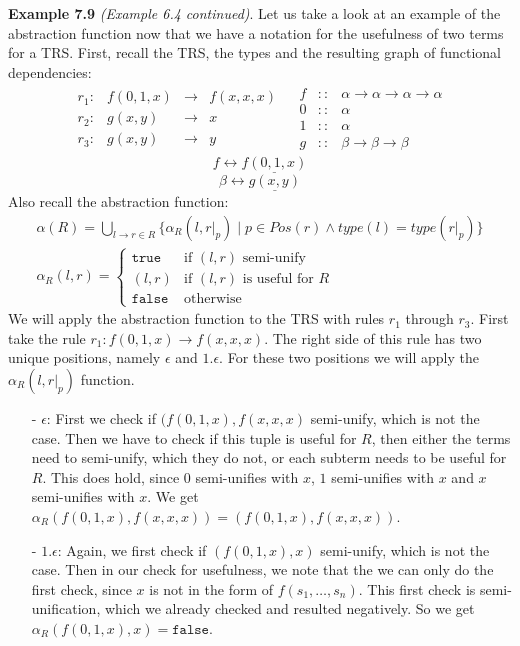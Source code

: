 \textbf{Example 7.9} \textit{(Example 6.4 continued)}. Let us take a look at an example of the abstraction function now that we have a notation for the usefulness of two terms for a TRS. First, recall the TRS, the types and the resulting graph of functional dependencies:
\[
\begin{array}{rl}
\begin{array}{lrcl}
    r_1: & f(0, 1, x) & \rightarrow & f(x, x, x) \\
    r_2: & g(x, y) & \rightarrow & x \\
    r_3: & g(x, y) & \rightarrow & y
\end{array} &
\begin{array}{rcl}
    f & :: & \alpha \rightarrow \alpha \rightarrow \alpha \rightarrow \alpha \\
    0 & :: & \alpha \\
    1 & :: & \alpha \\
    g & :: & \beta \rightarrow \beta \rightarrow \beta 
\end{array}
\end{array}
\]
\[
f \longleftrightarrow \underline{f(0, 1, x)} 
\]
\[
\beta \longleftrightarrow \underline{g(x,y)}
\]
Also recall the abstraction function:
\[
\begin{array}{c}
\alpha(R) = \bigcup\limits_{l \rightarrow r \in R} \{\alpha_R(l, \left.r\right|_p) \mid p \in \textit{Pos}(r) \land \textit{type}(l) = \textit{type}(\left.r\right|_p)\} \\
\alpha_R(l, r) =
\left\{
    \begin{array}{ll}
        \texttt{true} & \text{if } (l, r) \text{ semi-unify}\\
        (l, r) & \text{if } (l, r) \text{ is useful for } R\\
        \texttt{false} & \text{otherwise}
    \end{array}
\right.
\end{array}
\]
We will apply the abstraction function to the TRS with rules $r_1$ through $r_3$. First take the rule $r_1 : f(0, 1, x) \rightarrow f(x, x, x)$. The right side of this rule has two unique positions, namely $\epsilon$ and $1.\epsilon$. For these two positions we will apply the $\alpha_R(l, \left.r\right|_p)$ function.
\begin{itemize}
    \itemsep 0em
    \item[-] $\epsilon$: First we check if $(f(0, 1, x), f(x,x,x)$ semi-unify, which is not the case. Then we have to check if this tuple is useful for $R$, then either the terms need to semi-unify, which they do not, or each subterm needs to be useful for $R$. This does hold, since $0$ semi-unifies with $x$, $1$ semi-unifies with $x$ and $x$ semi-unifies with $x$. We get $\alpha_R(f(0, 1, x), f(x,x,x)) = (f(0, 1, x), f(x,x,x))$.
    \item[-] $1.\epsilon$: Again, we first check if $(f(0, 1, x), x)$ semi-unify, which is not the case. Then in our check for usefulness, we note that the we can only do the first check, since $x$ is not in the form of $f(s_1, \dots, s_n)$. This first check is semi-unification, which we already checked and resulted negatively. So we get $\alpha_R(f(0, 1, x), x) = \texttt{false}$.
\end{itemize}
